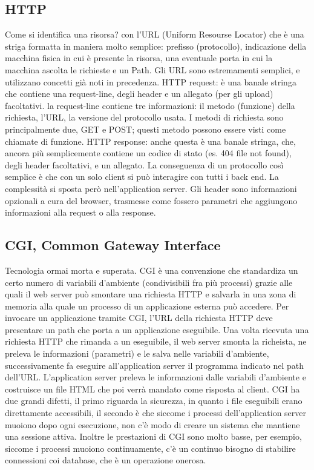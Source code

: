 \subsection{HTTP}
Come si identifica una risorsa? con l'URL (Uniform Resourse Locator) che è una striga formatta in maniera molto semplice: prefisso (protocollo), indicazione della macchina fisica in cui è presente la risorsa, una eventuale porta in cui la macchina ascolta le richieste e un Path. Gli URL sono estremamenti semplici, e utilizzano concetti già noti in precedenza.\newline
HTTP request: è una banale stringa che contiene una request-line, degli header e un allegato (per gli upload) facoltativi. la request-line contiene tre informazioni: il metodo (funzione) della richiesta, l'URL, la versione del protocollo usata. I metodi di richiesta sono principalmente due, GET e POST; questi metodo possono essere visti come chiamate di funzione.\newline
HTTP response: anche questa è una banale stringa, che, ancora più semplicemente contiene un codice di stato (es. 404 file not found), degli header facoltativi, e un allegato.\newline
La conseguenza di un protocollo così semplice è che con un solo client si può interagire con tutti i back end. La complessità si sposta però nell'application server.\newline
Gli header sono informazioni opzionali a cura del browser, trasmesse come fossero parametri che aggiungono informazioni alla request o alla response.
\subsection{CGI, Common Gateway Interface}
Tecnologia ormai morta e superata.\newline
CGI è una convenzione che standardiza un certo numero di variabili d'ambiente (condivisibili fra più processi) grazie alle quali il web server può smontare una richiesta HTTP e salvarla in una zona di memoria alla quale un processo di un applicazione esterna può accedere.\newline
Per invocare un applicazione tramite CGI, l'URL della richiesta HTTP deve presentare un path che porta a un applicazione eseguibile. Una volta ricevuta una richiesta HTTP che rimanda a un eseguibile, il web server smonta la richeista, ne preleva le informazioni (parametri) e le salva nelle variabili d'ambiente, successivamente fa eseguire all'application server il programma indicato nel path dell'URL. L'application server preleva le informazioni dalle variabili d'ambiente e costruisce un file HTML che poi verrà mandato come risposta al client.\newline
CGI ha due grandi difetti, il primo riguarda la sicurezza, in quanto i file eseguibili erano direttamente accessibili, il secondo è che siccome i processi dell'application server muoiono dopo ogni esecuzione, non c'è modo di creare un sistema che mantiene una sessione attiva. Inoltre le prestazioni di CGI sono molto basse, per esempio, siccome i processi muoiono continuamente, c'è un continuo bisogno di stabilire connessioni coi database, che è un operazione onerosa.\newline